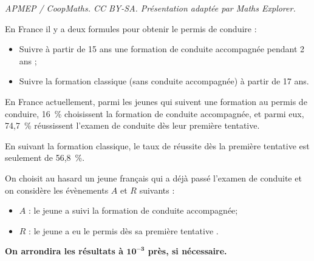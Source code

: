 \documentclass[10pt]{article}
\begin{document}
\noindent\textit{APMEP / CoopMaths. CC BY-SA. Présentation adaptée par Maths Explorer.}\par\medskip
\medskip

	En France il y a deux formules pour obtenir le permis de conduire :

	\begin{itemize}[label*={\textbullet~}]
		\item Suivre à partir de 15 ans une formation de conduite accompagnée pendant 2 ans ;
		\item Suivre la formation classique (sans conduite accompagnée) à partir de 17 ans.
	\end{itemize}

	\medskip

	En France actuellement, parmi les jeunes qui suivent une formation au permis de conduire, 16~\% choisissent la formation de conduite accompagnée, et parmi eux, 74,7~\% réussissent l'examen de conduite dès leur première tentative.


	En suivant la formation classique, le taux de réussite dès la première tentative est seulement de 56,8~\%.

	\bigskip

	On choisit au hasard un jeune français qui a déjà passé l'examen de conduite et on considère les évènements $A$ et $R$ suivants :

	\begin{itemize}[label*={\textbullet~}]
		\item $A$ : \og le jeune a suivi la formation de conduite accompagnée\fg{};
		\item $R$ : \og le jeune a eu le permis dès sa première tentative \fg{}.
	\end{itemize}

	\medskip

	\textbf{On arrondira les résultats à $\mathbf{10}^{\mathbf{-3}}$ près, si nécessaire.}

	\medskip
\end{document}
